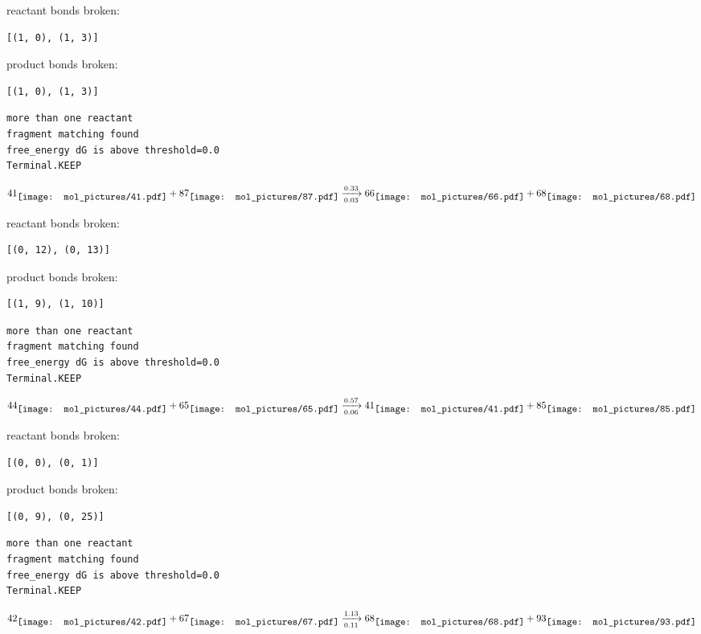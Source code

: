 \documentclass{article}
\begin{document}
reactant bonds broken:\begin{verbatim}
[(1, 0), (1, 3)]
\end{verbatim}
product bonds broken:\begin{verbatim}
[(1, 0), (1, 3)]
\end{verbatim}




\vspace{1cm}
\begin{verbatim}
more than one reactant
fragment matching found
free_energy dG is above threshold=0.0
Terminal.KEEP
\end{verbatim}
$$
41
\raisebox{-.5\height}{\texttt{[image: mol\_pictures/41.pdf]}}
+
87
\raisebox{-.5\height}{\texttt{[image: mol\_pictures/87.pdf]}}
\xrightarrow[0.03]{0.33}
66
\raisebox{-.5\height}{\texttt{[image: mol\_pictures/66.pdf]}}
+
68
\raisebox{-.5\height}{\texttt{[image: mol\_pictures/68.pdf]}}
$$


reactant bonds broken:\begin{verbatim}
[(0, 12), (0, 13)]
\end{verbatim}
product bonds broken:\begin{verbatim}
[(1, 9), (1, 10)]
\end{verbatim}




\vspace{1cm}
\begin{verbatim}
more than one reactant
fragment matching found
free_energy dG is above threshold=0.0
Terminal.KEEP
\end{verbatim}
$$
44
\raisebox{-.5\height}{\texttt{[image: mol\_pictures/44.pdf]}}
+
65
\raisebox{-.5\height}{\texttt{[image: mol\_pictures/65.pdf]}}
\xrightarrow[0.06]{0.57}
41
\raisebox{-.5\height}{\texttt{[image: mol\_pictures/41.pdf]}}
+
85
\raisebox{-.5\height}{\texttt{[image: mol\_pictures/85.pdf]}}
$$


reactant bonds broken:\begin{verbatim}
[(0, 0), (0, 1)]
\end{verbatim}
product bonds broken:\begin{verbatim}
[(0, 9), (0, 25)]
\end{verbatim}




\vspace{1cm}
\begin{verbatim}
more than one reactant
fragment matching found
free_energy dG is above threshold=0.0
Terminal.KEEP
\end{verbatim}
$$
42
\raisebox{-.5\height}{\texttt{[image: mol\_pictures/42.pdf]}}
+
67
\raisebox{-.5\height}{\texttt{[image: mol\_pictures/67.pdf]}}
\xrightarrow[0.11]{1.13}
68
\raisebox{-.5\height}{\texttt{[image: mol\_pictures/68.pdf]}}
+
93
\raisebox{-.5\height}{\texttt{[image: mol\_pictures/93.pdf]}}
$$
\end{document}
